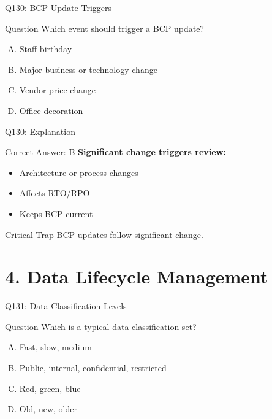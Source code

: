 \documentclass{beamer}
\begin{document}
	\begin{frame}{Q130: BCP Update Triggers}
		\begin{block}{Question}
			Which event should trigger a BCP update?
		\end{block}
		\begin{enumerate}[(A)]
			\item Staff birthday
			\item Major business or technology change
			\item Vendor price change
			\item Office decoration
		\end{enumerate}
	\end{frame}
	
	\begin{frame}{Q130: Explanation}
		\begin{block}{Correct Answer: B}
			\textbf{Significant change triggers review:}
			\begin{itemize}
				\item Architecture or process changes
				\item Affects RTO/RPO
				\item Keeps BCP current
			\end{itemize}
		\end{block}
		\begin{alertblock}{Critical Trap}
			BCP updates follow significant change.
		\end{alertblock}
	\end{frame}
	
	\section{4. Data Lifecycle Management}
	
	\begin{frame}{Q131: Data Classification Levels}
		\begin{block}{Question}
			Which is a typical data classification set?
		\end{block}
		\begin{enumerate}[(A)]
			\item Fast, slow, medium
			\item Public, internal, confidential, restricted
			\item Red, green, blue
			\item Old, new, older
		\end{enumerate}
	\end{frame}
	
\end{document}
